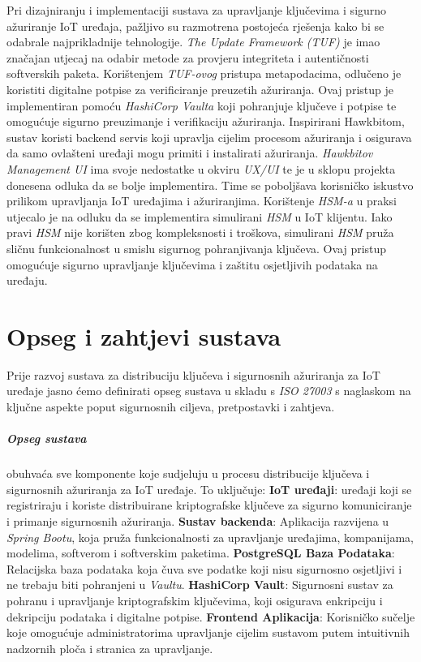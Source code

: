\documentclass[zavrsnirad]{fer}
\begin{document}
	Pri dizajniranju i implementaciji sustava za upravljanje ključevima i sigurno ažuriranje IoT uređaja, pažljivo su razmotrena postojeća rješenja kako bi se odabrale najprikladnije tehnologije.
	\textit{The Update Framework (TUF)} je imao značajan utjecaj na odabir metode za provjeru integriteta i autentičnosti softverskih paketa. Korištenjem \textit{TUF-ovog} pristupa metapodacima, odlučeno je koristiti digitalne potpise za verificiranje preuzetih ažuriranja. Ovaj pristup je implementiran pomoću \textit{HashiCorp Vaulta} koji pohranjuje ključeve i potpise te omogućuje sigurno preuzimanje i verifikaciju ažuriranja.  Inspirirani Hawkbitom, sustav koristi backend servis koji upravlja cijelim procesom ažuriranja i osigurava da samo ovlašteni uređaji mogu primiti i instalirati ažuriranja. \textit{Hawkbitov Management UI} ima svoje nedostatke u okviru \textit{UX/UI} te je u sklopu projekta donesena odluka da se bolje implementira. Time se poboljšava korisničko iskustvo prilikom upravljanja IoT uređajima i ažuriranjima.
	Korištenje \textit{HSM-a} u praksi utjecalo je na odluku da se implementira simulirani \textit{HSM} u IoT klijentu. Iako pravi \textit{HSM} nije korišten zbog kompleksnosti i troškova, simulirani \textit{HSM} pruža sličnu funkcionalnost u smislu sigurnog pohranjivanja ključeva. Ovaj pristup omogućuje sigurno upravljanje ključevima i zaštitu osjetljivih podataka na uređaju. 
	
	
	\chapter{Opseg i zahtjevi sustava}
	\label{pog:opseg_i_zahtjevi}
	Prije razvoj sustava za distribuciju ključeva i sigurnosnih ažuriranja za IoT uređaje jasno ćemo definirati opseg sustava u skladu s \textit{ISO 27003} s naglaskom na ključne aspekte poput sigurnosnih ciljeva, pretpostavki i zahtjeva. \cite{iso27003}
	
	\paragraph{Opseg sustava} obuhvaća sve komponente koje sudjeluju u procesu distribucije ključeva i sigurnosnih ažuriranja za IoT uređaje. To uključuje:
	\textbf{IoT uređaji}: uređaji koji se registriraju i koriste distribuirane kriptografske ključeve za sigurno komuniciranje i primanje sigurnosnih ažuriranja.
	\textbf{Sustav backenda}: Aplikacija razvijena u \textit{Spring Bootu}, koja pruža funkcionalnosti za upravljanje uređajima, kompanijama, modelima, softverom i softverskim paketima.
	\textbf{PostgreSQL Baza Podataka}: Relacijska baza podataka koja čuva sve podatke koji nisu sigurnosno osjetljivi i ne trebaju biti pohranjeni u \textit{Vaultu}.
	\textbf{HashiCorp Vault}: Sigurnosni sustav za pohranu i upravljanje kriptografskim ključevima, koji osigurava enkripciju i dekripciju podataka i digitalne potpise.
	\textbf{Frontend Aplikacija}: Korisničko sučelje koje omogućuje administratorima upravljanje cijelim sustavom putem intuitivnih nadzornih ploča i stranica za upravljanje.
	
\end{document}
